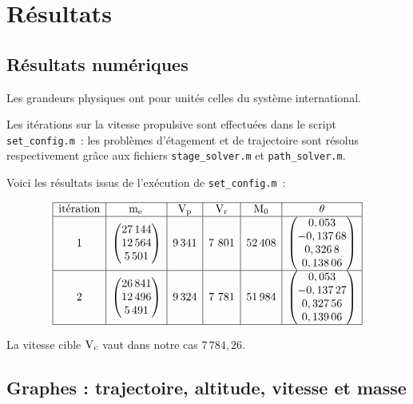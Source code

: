 \section{Résultats}

\subsection{Résultats numériques}

Les grandeurs physiques ont pour unités celles du système international.

Les itérations sur la vitesse propulsive sont effectuées dans le script \lstinline+set_config.m+~: les problèmes d'étagement et de trajectoire sont résolus respectivement grâce aux fichiers \lstinline+stage_solver.m+ et \lstinline+path_solver.m+.

Voici les résultats issus de l'exécution de \lstinline+set_config.m+~:

\[\begin{array}{|c|c|c|c|c|c|}\hline
\text{itération} & \masspropel{} & \propellingvlct & \realvlct & \mathrm{M}_0 & \theta\\ \hline
1 & \begin{pmatrix}27\,144\\ 12\,564\\ 5\,501\end{pmatrix} & 9\,341 & 7\ 801 & 52\,408 & %
\begin{pmatrix}0,053\\ -0,137\,68\\ 0,326\,8\\ 0,138\,06\end{pmatrix}\\\hline
2 & \begin{pmatrix}26\,841\\ 12\,496\\ 5\,491\end{pmatrix} & 9\,324 & 7\ 781 & 51\,984 & %
\begin{pmatrix}0,053\\ -0,137\,27\\ 0,327\,56\\ 0,139\,06\end{pmatrix}\\\hline
\end{array}\]

La vitesse cible $\mathrm{V}_{\mathrm{c}}$ vaut dans notre cas $7\,784,26$.

\subsection{Graphes : trajectoire, altitude, vitesse et masse}

